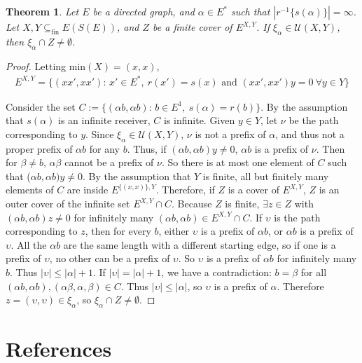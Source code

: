 \documentclass{article}
\newtheorem{theorem}{Theorem}[section]
\theoremstyle{definition}
\begin{document}
\begin{theorem} Let $E$ be a directed graph, and $\alpha \in E^*$ such that $|r^{-1}\{s(\alpha)\}| = \infty$.
    Let $X, Y \subseteq_{\text{fin}} E(S(E))$, and $Z$ be a finite cover of $E^{X, Y}$.
If $\xi_\alpha \in \mathcal{U}(X, Y)$, then $\xi_\alpha \cap Z \neq \emptyset$. \end{theorem}
\begin{proof}
    Letting min$(X) = (x, x)$,
    \begin{align*}
        E^{X, Y} = \{ (xx', xx') \text{: } x' \in E^*, \ r(x') = s(x) \text{ and } (xx', xx')y = 0 \ \forall y \in Y \}
    \end{align*}

    Consider the set $C := \{ (\alpha b, \alpha b)\text{: } b \in E^1, \ s(\alpha) = r(b) \}$. By the assumption
    that $s(\alpha)$ is an infinite receiver, $C$ is infinite. Given $y \in Y$, let $\nu$ be the path corresponding to $y$.
    Since $\xi_\alpha \in \mathcal{U}(X, Y)$, $\nu$ is not a prefix of $\alpha$, and thus not a proper prefix of $\alpha b$ 
    for any $b$. Thus, if $(\alpha b, \alpha b)y \neq 0$, $\alpha b$ is a prefix of $\nu$. Then for $\beta \neq b$, 
    $\alpha \beta$ cannot be a prefix of $\nu$. So there is at most one element of $C$ such that ($\alpha b, \alpha b)y \neq 0$.
    By the assumption that $Y$ is finite, all but finitely many elements of $C$ are inside $E^{\{(x, x)\}, Y}$. Therefore, if $Z$
    is a cover of $E^{X, Y}$, $Z$ is an outer cover of the infinite set $E^{X, Y} \cap C$. Because $Z$ is finite, $\exists z \in Z$ 
    with $(\alpha b, \alpha b)z \neq 0$ for infinitely many $(\alpha b, \alpha b) \in E^{X, Y} \cap C$. If $\upsilon$ is the path corresponding to $z$,
    then for every $b$, either $\upsilon$ is a prefix of $\alpha b$, or $\alpha b$ is a prefix of $\upsilon$.
    All the $\alpha b$ are the same length with a different starting edge, so if one is a prefix of $\upsilon$,
    no other can be a prefix of $\upsilon$. So $\upsilon$ is a prefix of $\alpha b$ for infinitely many $b$. Thus $|\upsilon| \leq |\alpha| + 1$.
    If $|\upsilon| = |\alpha| + 1$, we have a contradiction: $b = \beta$ for all $(\alpha b, \alpha b), (\alpha \beta, \alpha, \beta) \in C$.
    Thus $|\upsilon| \leq |\alpha|$, so $\upsilon$ is a prefix of $\alpha$. Therefore $z = (\upsilon, \upsilon) \in \xi_\alpha$, so 
    $\xi_\alpha \cap Z \neq \emptyset$.
\end{proof}

\section{References}
\end{document}
